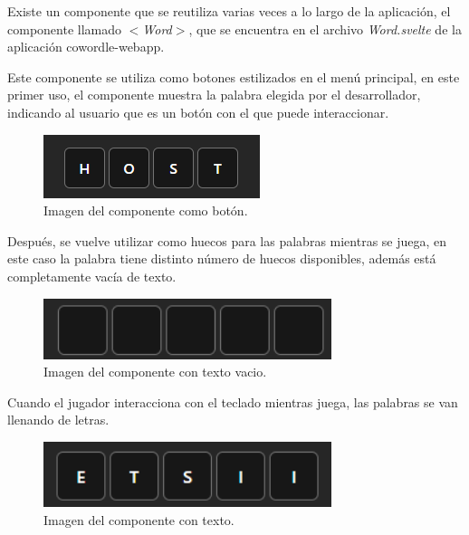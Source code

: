 Existe un componente que se reutiliza varias veces a lo largo de la aplicación, el componente llamado \textit{$<$Word$>$}, que se encuentra en el archivo \textit{Word.svelte} de la aplicación cowordle-webapp.

Este componente se utiliza como botones estilizados en el menú principal, en este primer uso, el componente muestra la palabra elegida por el desarrollador, indicando al usuario que es un botón con el que puede interaccionar.

\begin{figure}[H]
	\centering
	\includegraphics[clip=true]{images/reusing/host_component.png}
	\caption{Imagen del componente como botón.}
	\label{fig:comp_host_image}
\end{figure}

Después, se vuelve utilizar como huecos para las palabras mientras se juega, en este caso la palabra tiene distinto número de huecos disponibles, además está completamente vacía de texto.

\begin{figure}[H]
	\centering
	\includegraphics[clip=true, width=0.75\textwidth]{images/reusing/empty_component.png}
	\caption{Imagen del componente con texto vacio.}
	\label{fig:comp_empty}
\end{figure}


Cuando el jugador interacciona con el teclado mientras juega, las palabras se van llenando de letras.

\begin{figure}[H]
	\centering
	\includegraphics[clip=true, width=0.75\textwidth]{images/reusing/filled_component.png}
	\caption{Imagen del componente con texto.}
	\label{fig:comp_filled}
\end{figure}

